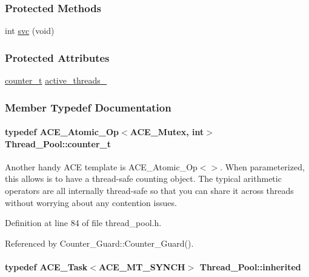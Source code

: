 \subsubsection*{Protected Methods}
\begin{CompactItemize}
\item 
int \hyperlink{classThread__Pool_Thread__Poolb0}{svc} (void)
\end{CompactItemize}
\subsubsection*{Protected Attributes}
\begin{CompactItemize}
\item 
\hyperlink{classThread__Pool_Thread__Pools1}{counter\_\-t} \hyperlink{classThread__Pool_Thread__Pooln0}{active\_\-threads\_\-}
\end{CompactItemize}


\subsubsection{Member Typedef Documentation}
\hypertarget{classThread__Pool_Thread__Pools1}{
\paragraph[counter\_\-t]{\setlength{\rightskip}{0pt plus 5cm}typedef ACE\_\-Atomic\_\-Op$<$ACE\_\-Mutex, int$>$ Thread\_\-Pool::counter\_\-t}\hfill}
\label{classThread__Pool_Thread__Pools1}


Another handy ACE template is ACE\_\-Atomic\_\-Op$<$$>$. When parameterized, this allows is to have a thread-safe counting object. The typical arithmetic operators are all internally thread-safe so that you can share it across threads without worrying about any contention issues. 

Definition at line 84 of file thread\_\-pool.h.

Referenced by Counter\_\-Guard::Counter\_\-Guard().\hypertarget{classThread__Pool_Thread__Pools0}{
\paragraph[inherited]{\setlength{\rightskip}{0pt plus 5cm}typedef ACE\_\-Task$<$ACE\_\-MT\_\-SYNCH$>$ Thread\_\-Pool::inherited}\hfill}
\label{classThread__Pool_Thread__Pools0}




